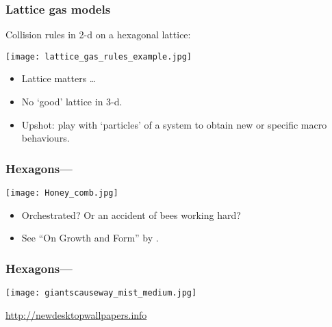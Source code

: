 \begin{frame}
  \frametitle{Lattice gas models}

  \begin{block}{Collision rules in 2-d on a hexagonal lattice:}
  \begin{center}
    \texttt{[image: lattice\_gas\_rules\_example.jpg]}
  \end{center}
  \end{block}

  \begin{block}{}
  \begin{itemize}
  \item<2->
    Lattice matters \ldots
  \item<3-> 
    No `good' lattice in 3-d.
  \item<4->
    Upshot: play with `particles' of a system to obtain new or specific macro behaviours.
  \end{itemize}
  \end{block}


\end{frame}

\begin{frame}
  \frametitle{Hexagons---}

  \begin{center}
    \texttt{[image: Honey\_comb.jpg]}
  \end{center}

  \begin{itemize}
  \item<1->
    Orchestrated?  Or an accident of bees working hard?
  \item<2-> 
    See ``On Growth and Form'' by 
    .\cite{thompson1952a,thompson1961a}
  \end{itemize}
  

\end{frame}


\begin{frame}
  \frametitle{Hexagons---}

  \texttt{[image: giantscauseway\_mist\_medium.jpg]}

  {\tiny \url{http://newdesktopwallpapers.info}}


\end{frame}


